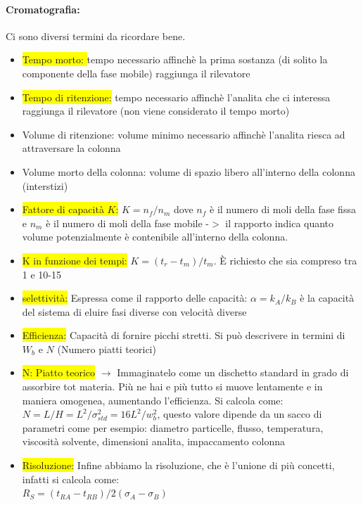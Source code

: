 \documentclass{article}
\begin{document}
\paragraph{Cromatografia: } Ci sono diversi termini da ricordare bene.
\begin{itemize}
	\item \colorbox{yellow}{Tempo morto: }tempo necessario affinchè la prima sostanza (di solito la componente della fase mobile) raggiunga il rilevatore
	\item \colorbox{yellow}{Tempo di ritenzione:} tempo necessario affinchè l'analita che ci interessa raggiunga il rilevatore (non viene considerato il tempo morto)
	\item Volume di ritenzione: volume minimo necessario affinchè l'analita riesca ad attraversare la colonna
	\item Volume morto della colonna: volume di spazio libero all'interno della colonna (interstizi)
	\item \colorbox{yellow}{Fattore di capacità $K$:} $K=n_f/n_m$ dove $n_f$ è il numero di moli della fase fissa e $n_m$ è il numero di moli della fase mobile -$>$ il rapporto indica quanto volume potenzialmente è contenibile all'interno della colonna.
	\item \colorbox{yellow}{K in funzione dei tempi:} $K = (t_r-t_m) / t_m$. È richiesto che sia compreso tra 1 e 10-15
	\item \colorbox{yellow}{selettività:} Espressa come il rapporto delle capacità: $\alpha = k_A / k_B$ è la capacità del sistema di eluire fasi diverse con velocità diverse
	\item \colorbox{yellow}{Efficienza:} Capacità di fornire picchi stretti. Si può descrivere in termini di $W_b$ e $N$ (Numero piatti teorici)
	\item \colorbox{yellow}{N: Piatto teorico} $\rightarrow$ Immaginatelo come un dischetto standard in grado di assorbire tot materia. Più ne hai e più tutto si muove lentamente e in maniera omogenea, aumentando l'efficienza. Si calcola come: $N = L/H =L^2/\sigma_{std}^2=16L^2/w_b^2$, questo valore dipende da un sacco di parametri come per esempio: diametro particelle, flusso, temperatura, viscosità solvente, dimensioni analita, impaccamento colonna 
	\item \colorbox{yellow}{Risoluzione:} Infine abbiamo la risoluzione, che è l'unione di più concetti, infatti si calcola come: 
	\\$R_S = (t_{RA} - t_{RB}) / 2(\sigma_A - \sigma_B)$
\end{itemize}
\end{document}
